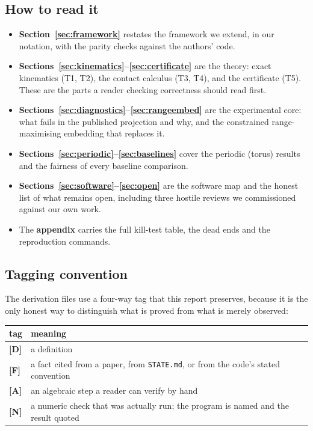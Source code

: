 \documentclass[11pt,a4paper]{article}
\theoremstyle{definition}
\newcommand{\file}[1]{\texttt{\small #1}}
\begin{document}
\subsection{How to read it}

\begin{itemize}\itemsep3pt
\item \textbf{Section~\ref{sec:framework}} restates the framework we extend, in our
notation, with the parity checks against the authors' code.
\item \textbf{Sections~\ref{sec:kinematics}--\ref{sec:certificate}} are the theory:
exact kinematics (T1, T2), the contact calculus (T3, T4), and the certificate (T5).
These are the parts a reader checking correctness should read first.
\item \textbf{Sections~\ref{sec:diagnostics}--\ref{sec:rangeembed}} are the experimental
core: what fails in the published projection and why, and the constrained
range-maximising embedding that replaces it.
\item \textbf{Sections~\ref{sec:periodic}--\ref{sec:baselines}} cover the periodic
(torus) results and the fairness of every baseline comparison.
\item \textbf{Sections~\ref{sec:software}--\ref{sec:open}} are the software map and the
honest list of what remains open, including three hostile reviews we commissioned against
our own work.
\item The \textbf{appendix} carries the full kill-test table, the dead ends and the
reproduction commands.
\end{itemize}

\subsection{Tagging convention}

The derivation files use a four-way tag that this report preserves, because it is the
only honest way to distinguish what is proved from what is merely observed:

\begin{center}
\small
\begin{tabular}{@{}ll@{}}
\toprule
tag & meaning \\
\midrule
\textbf{[D]} & a definition \\
\textbf{[F]} & a fact cited from a paper, from \file{STATE.md}, or from the code's stated convention \\
\textbf{[A]} & an algebraic step a reader can verify by hand \\
\textbf{[N]} & a numeric check that was actually run; the program is named and the result quoted \\
\bottomrule
\end{tabular}
\end{center}
\end{document}
